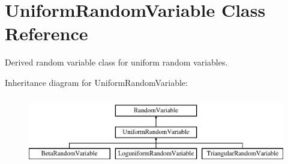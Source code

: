 \section{Uniform\+Random\+Variable Class Reference}
\label{classPecos_1_1UniformRandomVariable}


Derived random variable class for uniform random variables.  


Inheritance diagram for Uniform\+Random\+Variable\+:\begin{figure}[H]
\begin{center}
\leavevmode
\includegraphics[height=3.000000cm]{classPecos_1_1UniformRandomVariable}
\end{center}
\end{figure}
